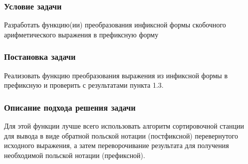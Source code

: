 \documentclass[a4paper, 14pt]{extarticle}
\begin{document}
\subsubsection{Условие задачи}
Разработать функцию(ии) преобразования инфиксной формы
скобочного арифметического выражения в префиксную форму
\subsubsection{Постановка задачи}
Реализовать функцию  преобразования выражения из инфиксной формы в префиксную
и проверить с результатами пункта 1.3.
\subsubsection{Описание подхода решения задачи}
Для этой функции лучше всего использовать алгоритм сортировочной станции для
вывода в виде обратной польской нотации (постфиксной) перевернутого исходного
выражения, а затем переворочивание результата для получения необходимой польской
нотации (префиксной).
\end{document}
